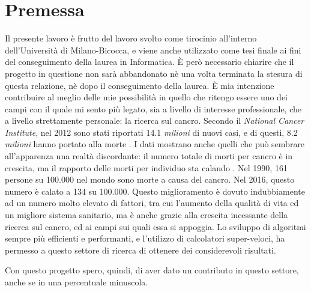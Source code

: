 \cleardoublepage

\null{}
\chapter*{\centering Premessa}

Il presente lavoro è frutto del lavoro svolto come tirocinio all'interno dell'Università di Milano-Bicocca, e viene anche utilizzato come tesi finale ai fini del conseguimento della laurea in Informatica. È però necessario chiarire che il progetto in questione non sarà abbandonato nè una volta terminata la stesura di questa relazione, nè dopo il conseguimento della laurea. È mia intenzione contribuire al meglio delle mie possibilità in quello che ritengo essere uno dei campi con il quale mi sento più legato, sia a livello di interesse professionale, che a livello strettamente personale: la ricerca sul cancro. Secondo il \textit{National Cancer Institute}, nel 2012 sono stati riportati 14.1 \textit{milioni} di nuovi casi, e di questi, 8.2 \textit{milioni} hanno portato alla morte \cite{cancerstats}. I dati mostrano anche quelli che può sembrare all'apparenza una realtà discordante: il numero totale di morti per cancro è in crescita, ma il rapporto delle morti per individuo sta calando \cite{worldindatacancer}. Nel 1990, 161 persone su 100.000 nel mondo sono morte a causa del cancro. Nel 2016, questo numero è calato a 134 su 100.000. Questo miglioramento è dovuto indubbiamente ad un numero molto elevato di fattori, tra cui l'aumento della qualità di vita ed un migliore sistema sanitario, ma è anche grazie alla crescita incessante della ricerca sul cancro, ed ai campi sui quali essa si appoggia. Lo sviluppo di algoritmi sempre più efficienti e performanti, e l'utilizzo di calcolatori super-veloci, ha permesso a questo settore di ricerca di ottenere dei considerevoli risultati.

Con questo progetto spero, quindi, di aver dato un contributo in questo settore, anche se in una percentuale minuscola.

 \null

\newpage
\cleardoublepage
\begingroup
\let\clearpage\endgroup
\null{}
